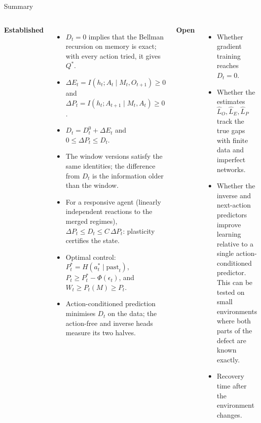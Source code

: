 \documentclass[11pt,aspectratio=169]{beamer}
\newcommand{\dE}{\Delta E}
\newcommand{\dP}{\Delta P}
\begin{document}
\begin{frame}[shrink=15]{Summary}
\begin{columns}[T]
\textbf{Established}
\begin{itemize}
\item $D_t = 0$ implies that the Bellman recursion on memory is exact; with every action tried, it gives $Q^*$.
\item $\dE_t = I(h_t; A_t \mid M_t, O_{t+1}) \ge 0$ and $\dP_t = I(h_t; A_{t+1} \mid M_t, A_t) \ge 0$.
\item $D_t = D^0_t + \dE_t$ and $0 \le \dP_t \le D_t$.
\item The window versions satisfy the same identities; the difference from $D_t$ is the information older than the window.
\item For a responsive agent (linearly independent reactions to the merged regimes), $\Delta P_t \le D_t \le C\,\Delta P_t$: plasticity certifies the state.
\item Optimal control: $P^*_t = H(a^*_t \mid \mathrm{past}_t)$, $P_t \ge P^*_t - \Phi(\epsilon_t)$, and $W_t \ge P_t(M) \ge P_t$.
\item Action-conditioned prediction minimises $D_t$ on the data; the action-free and inverse heads measure its two halves.
\end{itemize}
\textbf{Open}
\begin{itemize}
\item Whether gradient training reaches $D_t = 0$.
\item Whether the estimates $\hat L_O, \hat L_E, \hat L_P$ track the true gaps with finite data and imperfect networks.
\item Whether the inverse and next-action predictors improve learning relative to a single action-conditioned predictor. This can be tested on small environments where both parts of the defect are known exactly.
\item Recovery time after the environment changes.
\end{itemize}
\end{columns}
\end{frame}
\end{document}
